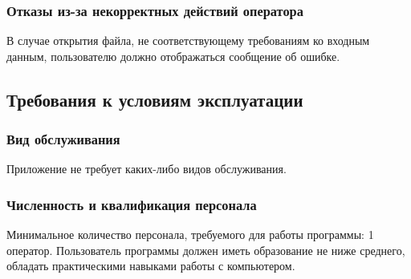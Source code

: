\subsubsection{Отказы из-за некорректных действий оператора}
В случае открытия файла, не соответствующему требованиям ко входным данным, пользователю должно отображаться сообщение об ошибке.

\subsection{Требования к условиям эксплуатации}
\subsubsection{Вид обслуживания}
Приложение не требует каких-либо видов обслуживания.
\subsubsection{Численность и квалификация персонала}
Минимальное количество персонала, требуемого для работы программы: 1 оператор. Пользователь программы должен иметь образование не ниже среднего, обладать практическими навыками работы с компьютером.


